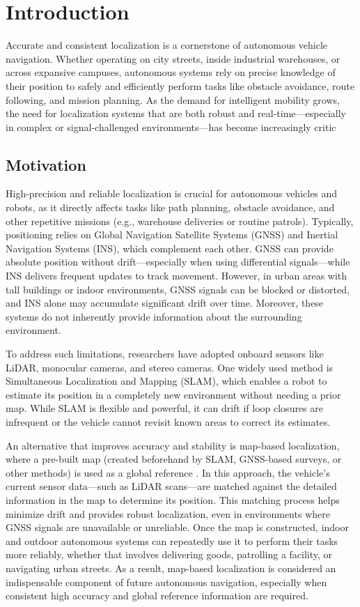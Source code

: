 \chapter{Introduction}
\label{ch:intro}
Accurate and consistent localization is a cornerstone of autonomous vehicle navigation. Whether operating on city streets, inside industrial warehouses, or across expansive campuses, autonomous systems rely on precise knowledge of their position to safely and efficiently perform tasks like obstacle avoidance, route following, and mission planning. As the demand for intelligent mobility grows, the need for localization systems that are both robust and real-time—especially in complex or signal-challenged environments—has become increasingly critic
\section{Motivation}
High-precision and reliable localization is crucial for autonomous vehicles and robots, as it directly affects tasks like path planning, obstacle avoidance, and other repetitive missions (e.g., warehouse deliveries or routine patrols)\cite{kim2018stereo}. Typically, positioning relies on Global Navigation Satellite Systems (GNSS) and Inertial Navigation Systems (INS), which complement each other. GNSS can provide absolute position without drift—especially when using differential signals—while INS delivers frequent updates to track movement\cite{carvalho1997optimal}. However, in urban areas with tall buildings or indoor environments, GNSS signals can be blocked or distorted, and INS alone may accumulate significant drift over time\cite{liu2019segmentation}. Moreover, these systems do not inherently provide information about the surrounding environment.

To address such limitations, researchers have adopted onboard sensors like LiDAR, monocular cameras, and stereo cameras. One widely used method is Simultaneous Localization and Mapping (SLAM), which enables a robot to estimate its position in a completely new environment without needing a prior map. While SLAM is flexible and powerful, it can drift if loop closures are infrequent or the vehicle cannot revisit known areas to correct its estimates.

An alternative that improves accuracy and stability is map-based localization, where a pre-built map (created beforehand by SLAM, GNSS-based surveys, or other methods) is used as a global reference \cite{levinson2007mapbased}. In this approach, the vehicle’s current sensor data—such as LiDAR scans—are matched against the detailed information in the map to determine its position. This matching process helps minimize drift and provides robust localization, even in environments where GNSS signals are unavailable or unreliable. Once the map is constructed, indoor and outdoor autonomous systems can repeatedly use it to perform their tasks more reliably, whether that involves delivering goods, patrolling a facility, or navigating urban streets. As a result, map-based localization is considered an indispensable component of future autonomous navigation, especially when consistent high accuracy and global reference information are required.

